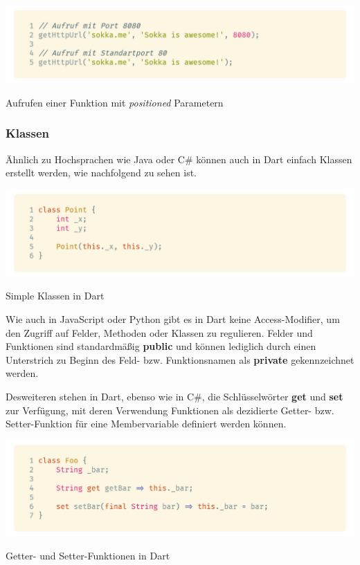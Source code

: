 \begin{code}[H]
    \centering
    \includegraphics[width=1\textwidth]{images/Dart/theory/dartCallPositionedFunction.png}
    \vspace{-25pt}
    \caption{Aufrufen einer Funktion mit \textit{positioned} Parametern}
\end{code}

\newpage

\subsubsection{Klassen}

Ähnlich zu Hochsprachen wie Java oder C\# können auch in Dart einfach Klassen erstellt werden, wie nachfolgend zu sehen ist.

\begin{code}[H]
    \centering
    \includegraphics[width=1\textwidth]{images/Dart/theory/dartClass.png}
    \vspace{-25pt}
    \caption{Simple Klassen in Dart}
\end{code}

Wie auch in JavaScript oder Python gibt es in Dart keine Access-Modifier, um den Zugriff auf Felder, Methoden oder Klassen zu regulieren. Felder und Funktionen sind standardmäßig \textbf{public} und können lediglich durch einen Unterstrich zu Beginn des Feld- bzw. Funktionsnamen als \textbf{private} gekennzeichnet werden.

Desweiteren stehen in Dart, ebenso wie in C\#, die Schlüsselwörter \textbf{get} und \textbf{set} zur Verfügung, mit deren Verwendung Funktionen als dezidierte Getter- bzw.
Setter-Funktion für eine Membervariable definiert werden können.

\begin{code}[H]
    \centering
    \includegraphics[width=1\textwidth]{images/Dart/theory/dartGetterSetter.png}
    \vspace{-25pt}
    \caption{Getter- und Setter-Funktionen in Dart}
\end{code}

